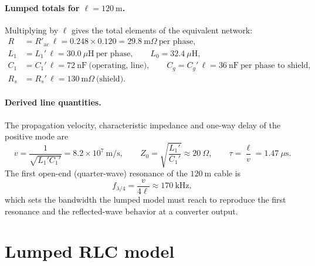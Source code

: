 \documentclass[11pt,a4paper,oneside]{book}
\begin{document}
\begin{onehalfspace}
\begin{appendices}
\paragraph{Lumped totals for $\ell=120\ \mathrm{m}$.}
Multiplying by $\ell$ gives the total elements of the equivalent network:
\begin{align*}
	R &= R'_{\mathrm{ac}}\,\ell = 0.248\times0.120 = 29.8\ \mathrm{m}\Omega \ \text{per phase},\\
	L_1 &= L_1'\,\ell = 30.0\ \mu\mathrm{H} \ \text{per phase},\qquad
	L_0 = 32.4\ \mu\mathrm{H},\\
	C_1 &= C_1'\,\ell = 72\ \mathrm{nF} \ \text{(operating, line)},\qquad
	C_g = C_g'\,\ell = 36\ \mathrm{nF} \ \text{per phase to shield},\\
	R_s &= R_s'\,\ell = 130\ \mathrm{m}\Omega \ \text{(shield)}.
\end{align*}

\paragraph{Derived line quantities.}
The propagation velocity, characteristic impedance and one-way delay of the
positive mode are
\begin{equation}
	v=\frac{1}{\sqrt{L_1'C_1'}}=8.2\times10^{7}\ \mathrm{m/s},
	\qquad
	Z_0=\sqrt{\frac{L_1'}{C_1'}}\approx20\ \Omega,
	\qquad
	\tau=\frac{\ell}{v}=1.47\ \mu\mathrm{s}.
	\label{eq:derived}
\end{equation}
The first open-end (quarter-wave) resonance of the $120\ \mathrm{m}$ cable is
\begin{equation}
	f_{\lambda/4}=\frac{v}{4\ell}\approx170\ \mathrm{kHz},
	\label{eq:fres}
\end{equation}
which sets the bandwidth the lumped model must reach to reproduce the first
resonance and the reflected-wave behavior at a converter output.

\section{Lumped RLC model}\label{sec:lumped}


\end{appendices}
\end{onehalfspace}
\end{document}
